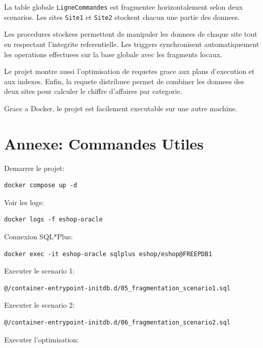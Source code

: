 \documentclass[12pt,a4paper]{report}
\begin{document}
La table globale \texttt{LigneCommandes} est fragmentee horizontalement selon deux scenarios. Les sites \texttt{Site1} et \texttt{Site2} stockent chacun une partie des donnees.

Les procedures stockees permettent de manipuler les donnees de chaque site tout en respectant l'integrite referentielle. Les triggers synchronisent automatiquement les operations effectuees sur la base globale avec les fragments locaux.

Le projet montre aussi l'optimisation de requetes grace aux plans d'execution et aux indexes. Enfin, la requete distribuee permet de combiner les donnees des deux sites pour calculer le chiffre d'affaires par categorie.

Grace a Docker, le projet est facilement executable sur une autre machine.

\chapter*{Annexe: Commandes Utiles}

Demarrer le projet:

\begin{lstlisting}[style=textstyle]
docker compose up -d
\end{lstlisting}

Voir les logs:

\begin{lstlisting}[style=textstyle]
docker logs -f eshop-oracle
\end{lstlisting}

Connexion SQL*Plus:

\begin{lstlisting}[style=textstyle]
docker exec -it eshop-oracle sqlplus eshop/eshop@FREEPDB1
\end{lstlisting}

Executer le scenario 1:

\begin{lstlisting}[style=sqlstyle]
@/container-entrypoint-initdb.d/05_fragmentation_scenario1.sql
\end{lstlisting}

Executer le scenario 2:

\begin{lstlisting}[style=sqlstyle]
@/container-entrypoint-initdb.d/06_fragmentation_scenario2.sql
\end{lstlisting}

Executer l'optimisation:
\end{document}
